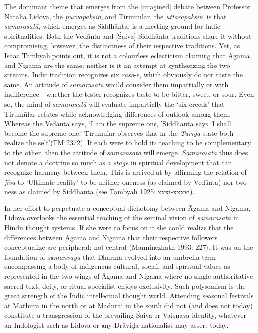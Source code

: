 The dominant theme that emerges from the [imagined] debate between Professor Natalia Lidova, the \textit{pūrvapakṣin}, and Tirumūlar, the \textit{uttarapakṣin}, is that \textit{samarasatā}, which emerges as Siddhānta, is a meeting ground for Indic spiritualities. Both the Vedānta and [Śaiva] Siddhānta traditions share it without compromising, however, the distinctness of their respective traditions. Yet, as Isaac Tambyah points out, it is not a colourless eclecticism claiming that Āgama and Nigama are the same; neither is it an attempt at synthesizing the two streams. Indic tradition recognizes six \textit{rasa}-s, which obviously do not taste the same. An attitude of \textit{samarasatā} would consider them impartially or with indifference—whether the tester recognizes taste to be bitter, sweet, or sour. Even so, the mind of \textit{samarasatā} will evaluate impartially the ‘six creeds’ that Tirumūlar refutes while acknowledging differences of outlook among them. Whereas the Vedānta says, ‘I am the supreme one, ’Siddhānta says ‘I shall become the supreme one.’ Tirumūlar observes that in the \textit{Turīya} state both realize the self’(TM 2372). If each were to hold its teaching to be complementary to the other, then the attitude of \textit{samarasatā} will emerge. \textit{Samarasatā} thus does not denote a doctrine so much as a \textit{stage} in spiritual development that can recognize harmony between them. This is arrived at by affirming the relation of \textit{jīva} to ‘Ultimate reality’ to be neither oneness (as claimed by Vedānta) nor two-ness as claimed by Siddhānta (see Tambyah 1925: xxxi-xxxvi).

In her effort to perpetuate a conceptual dichotomy between Āgama and Nigama, Lidova overlooks the essential teaching of the seminal vision of \textit{samarasatā} in Hindu thought systems. If she were to focus on it she could realize that the differences between Āgama and Nigama that their respective followers conceptualize are peripheral; not central (Manninezhath 1993: 227). It was on the foundation of \textit{samanvaya} that Dharma evolved into an umbrella term encompassing a body of indigenous cultural, social, and spiritual values as represented in the two wings of Āgama and Nigama where no single authoritative sacred text, deity, or ritual specialist enjoys exclusivity. Such polysemism is the great strength of the Indic intellectual thought world. Attending seasonal festivals at Mathura in the north or at Madurai in the south did not (and does not today) constitute a transgression of the prevailing Śaiva or Vaiṣṇava identity, whatever an Indologist such as Lidova or any Drāviḍa nationalist may assert today.

